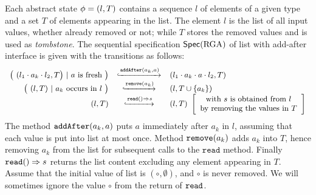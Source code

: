 \begin{example}
  \label{definition:sequential specification of rga}
  Each abstract state $\abstate = (l,T)$ contains a sequence $l$ of
  elements of a given type and a set $T$ of elements appearing in the
  list.
  The element $l$ is the list of all input values, whether already
  removed or not; while $T$ stores the removed values and is used as
  \emph{tombstone}.
  The sequential specification $\specRGA$ of list with add-after interface is
  given with the transitions as follows:
  \[\small
    \begin{array}{rcl}
      \big(\ (l_1 \cdot a_k \cdot l_2,T\big)\ |\ a\text{ is fresh}\ \big)
      & \specarrow{\alabelshort[\mathtt{addAfter}]{a_k,a}}
      & (l_1 \cdot a_k \cdot a \cdot l_2,T)\\
      \big(\ (l,T)\ |\ a_k\ \text{occurs in}\ l\ \big)
      & \specarrow{\alabelshort[\mathtt{remove}]{a_k}}
      & (l,T \cup \{a_k\})\\
      (l,T)
      & \specarrow{\alabellong[\mathtt{read}]{}{s}{}}
      & (l,T)\
        \left[\begin{array}{c}
                 \text{with $s$ is obtained from $l$}\\
                 \text{by removing the values in $T$}
        \end{array}\right]
 \end{array}
  \]
The method $\alabelshort[\mathtt{addAfter}]{a_k,a}$ puts $a$ immediately
  after $a_k$ in $l$, assuming that each value is put into list at
  most once.
  Method $\alabelshort[\mathtt{remove}]{a_k}$ adds $a_k$ into $T$,
  hence removing $a_k$ from the list for subsequent calls to the
  $\mathtt{read}$ method.
  Finally $\alabellong[\mathtt{read}]{}{s}{}$ returns the list content
  excluding any element appearing in $T$.
  Assume that the initial value of list is $(\circ,\emptyset)$, and
  $\circ$ is never removed.
  We will sometimes ignore the value $\circ$ from the return of
  $\ensuremath{\tt read}$.
\end{example}

